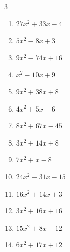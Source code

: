 \begin{multicols}{3}
\begin{enumerate}
  \item $27x^{2}+33x-4$

        \phantom{$=(3x+4)(9x-1)$}

  \item $5x^{2}-8x+3$

        \phantom{$=(5x-3)(x-1)$}

  \item $9x^{2}-74x+16$

        \phantom{$=(9x-2)(x-8)$}

  \item $x^{2}-10x+9$

        \phantom{$=(x-1)(x-9)$}

\columnbreak %

  \item $9x^{2}+38x+8$

        \phantom{$=(x+4)(9x+2)$}

  \item $4x^{2}+5x-6$

        \phantom{$=(x+2)(4x-3)$}

  \item $8x^{2}+67x-45$

        \phantom{$=(x+9)(8x-5)$}

  \item $3x^{2}+14x+8$

        \phantom{$=(3x+2)(x+4)$}

  \item $7x^{2}+x-8$

        \phantom{$=(x-1)(7x+8)$}

  \item $24x^{2}-31x-15$

        \phantom{$=(3x-5)(8x+3)$}

  \item $16x^{2}+14x+3$

        \phantom{$=(8x+3)(2x+1)$}

  \item $3x^{2}+16x+16$

        \phantom{$=(x+4)(3x+4)$}

  \item $15x^{2}+8x-12$

        \phantom{$=(3x-2)(5x+6)$}

  \item $6x^{2}+17x+12$

        \phantom{$=(2x+3)(3x+4)$}

\columnbreak %


\end{enumerate}
\end{multicols}
